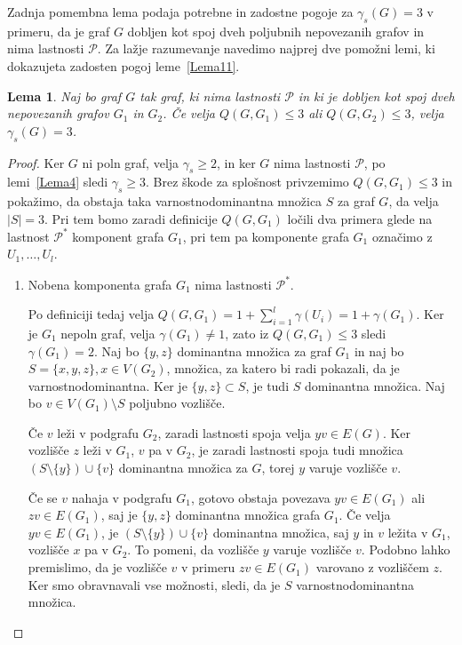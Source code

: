 \documentclass[12pt,a4paper,twoside]{article}
\theoremstyle{definition} %
\theoremstyle{plain} %
\newtheorem{lema}[definicija]{Lema}
\numberwithin{equation}{section}  %
\begin{document}
Zadnja pomembna lema podaja potrebne in zadostne pogoje za $\gamma_s(G) = 3$ v primeru, da je graf $G$ dobljen kot spoj dveh poljubnih nepovezanih grafov in nima lastnosti $\mathcal{P}$. Za lažje razumevanje navedimo najprej dve pomožni lemi, ki dokazujeta zadosten pogoj leme~\ref{Lema11}. 

\begin{lema}\label{Lema9}
Naj bo graf $G$ tak graf, ki nima lastnosti $\mathcal{P}$ in ki je dobljen kot spoj dveh nepovezanih grafov $G_1$ in $G_2$. Če velja $Q(G, G_1) \leq 3$ ali $Q(G, G_2) \leq 3$, velja $\gamma_s(G) = 3$.
\end{lema}
\begin{proof}
Ker $G$ ni poln graf, velja $\gamma_s \geq 2$, in ker $G$ nima lastnosti $\mathcal{P}$, po lemi~\ref{Lema4} sledi $\gamma_s \geq 3$. Brez škode za splošnost privzemimo $Q(G, G_1) \leq 3$ in pokažimo, da obstaja taka varnostnodominantna množica $S$ za graf $G$, da velja $|S|=3$. Pri tem bomo zaradi definicije $Q(G, G_1)$ ločili dva primera glede na lastnost $\mathcal{P^*}$ komponent grafa $G_1$, pri tem pa komponente grafa $G_1$ označimo z $U_1, \dots, U_l$.
\begin{enumerate}[label=($\roman*$)]
\item Nobena komponenta grafa $G_1$ nima lastnosti $\mathcal{P^*}$.

Po definiciji tedaj velja $Q(G, G_1) = 1 + \sum\limits_{i=1}^l \gamma(U_i) = 1 + \gamma(G_1)$. Ker je $G_1$ nepoln graf, velja $\gamma(G_1) \neq 1$, zato iz $Q(G, G_1) \leq 3$ sledi $\gamma(G_1) = 2$. Naj bo $\{y, z\}$ dominantna množica za graf $G_1$ in naj bo $S=\{x, y,  z\}, x \in V(G_2)$, množica, za katero bi radi pokazali, da je varnostnodominantna. Ker je $\{y, z\} \subset S$, je tudi $S$ dominantna množica. Naj bo $v \in V(G_1) \setminus S$ poljubno vozlišče.

Če $v$ leži v podgrafu $G_2$, zaradi lastnosti spoja velja $yv \in E(G)$. Ker vozlišče $z$ leži v $G_1$, $v$ pa v $G_2$, je zaradi lastnosti spoja tudi množica $(S \setminus \{y\}) \cup \{v\}$ dominantna množica za $G$, torej $y$ varuje vozlišče $v$.

Če se $v$ nahaja v podgrafu $G_1$, gotovo obstaja povezava $yv \in E(G_1)$ ali $zv \in E(G_1)$, saj je $\{y, z\}$ dominantna množica grafa $G_1$. Če velja $yv \in E(G_1)$, je $(S \setminus \{y\}) \cup \{v\}$ dominantna množica, saj $y$ in $v$ ležita v $G_1$, vozlišče $x$ pa v $G_2$. To pomeni, da vozlišče $y$ varuje vozlišče $v$. Podobno lahko premislimo, da je vozlišče $v$ v primeru $zv \in E(G_1)$ varovano z vozliščem $z$. Ker smo obravnavali vse možnosti, sledi, da je $S$ varnostnodominantna množica.


\end{enumerate}
\end{proof}
\end{document}
